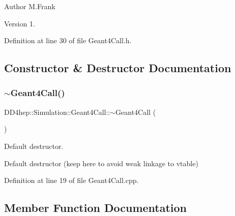 \begin{DoxyAuthor}{Author}
M.\+Frank 
\end{DoxyAuthor}
\begin{DoxyVersion}{Version}
1. 
\end{DoxyVersion}


Definition at line 30 of file Geant4\+Call.\+h.



\subsection{Constructor \& Destructor Documentation}
\hypertarget{class_d_d4hep_1_1_simulation_1_1_geant4_call_ae26b15b06c969e57c214235d31fa754f}{}\label{class_d_d4hep_1_1_simulation_1_1_geant4_call_ae26b15b06c969e57c214235d31fa754f} 
\subsubsection{\texorpdfstring{$\sim$\+Geant4\+Call()}{~Geant4Call()}}
{\footnotesize\ttfamily D\+D4hep\+::\+Simulation\+::\+Geant4\+Call\+::$\sim$\+Geant4\+Call (\begin{DoxyParamCaption}{ }\end{DoxyParamCaption})\hspace{0.3cm}{\ttfamily [virtual]}}



Default destructor. 

Default destructor (keep here to avoid weak linkage to vtable) 

Definition at line 19 of file Geant4\+Call.\+cpp.



\subsection{Member Function Documentation}
\hypertarget{class_d_d4hep_1_1_simulation_1_1_geant4_call_ab55505a1c9fb5e928c995d1312d4158e}{}\label{class_d_d4hep_1_1_simulation_1_1_geant4_call_ab55505a1c9fb5e928c995d1312d4158e} 
